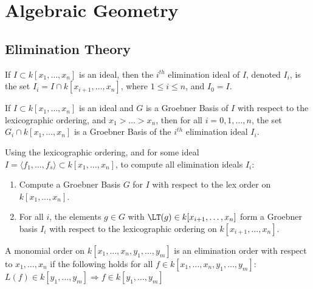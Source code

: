 \documentclass[crop=false,class=article,oneside]{standalone}
\begin{document}
    \ifx\ifsub\undefined
        \section*{Algebraic Geometry}
        \setcounter{section}{1}
    \fi
    \subsection{Elimination Theory}
        \begin{definition}
            If $I\subset{k}[x_1,\hdots,x_{n}]$ is an ideal,
            then the $i^{th}$ elimination ideal of $I$,
            denoted $I_{i}$, is the set
            $I_{i}=I\cap{k}[x_{i+1},\hdots,x_{n}]$,
            where $1\leq{i}\leq{n}$, and $I_{0}=I$.
        \end{definition}
        \begin{theorem}
            If $I\subset k[x_1,\hdots ,x_n]$ is an ideal and
            $G$ is a Groebner Basis of $I$ with respect to the
            lexicographic ordering, and $x_1>\hdots > x_n$, then
            for all $i=0,1,\hdots,n$, the set
            $G_{i}\cap{k}[x_1,\hdots,x_n]$ is a Groebner Basis of
            the $i^{th}$ elimination ideal $I_{i}$.
        \end{theorem}
        \begin{remark}
            Using the lexicographic ordering, and for some ideal
            $I=\langle{f_{1}},\hdots,f_{s}\rangle%
               \subset{k}[x_1,\hdots ,x_n]$,
            to compute all elimination ideals $I_{i}$:
            \begin{enumerate}
                \item Compute a Groebner Basis $G$ for $I$ with
                      respect to the lex order on $k[x_1,\hdots,x_n]$.
                \item For all $i$, the elements $g\in G$ with
                      $\LT(g)\in{k}[x_{i+1},\hdots,x_{n}]$ form a
                      Groebner basis $I_{i}$ with respect to
                      the lexicographic ordering on
                      $k[x_{i+1},\hdots,x_n]$.
            \end{enumerate}
        \end{remark}
        \begin{definition}
            A monomial order on
            $k[x_{1},\hdots,x_{n},y_{1},\hdots,y_{m}]$
            is an elimination order with respect to
            $x_{1},\hdots,x_{n}$ if the following holds for
            all $f\in{k}[x_{1},\hdots,x_{n},y_{1},\hdots,y_{m}]$:
            $L(f)\in{k}[y_{1},\hdots,y_{m}]%
             \Rightarrow{f}\in{k}[y_{1},\hdots,y_{m}]$
        \end{definition}
\end{document}
